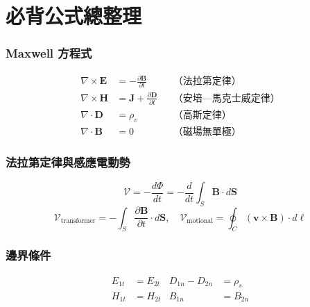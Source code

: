 \documentclass[12pt,a4paper]{article}
\newcommand{\vE}{\mathbf{E}}
\newcommand{\vB}{\mathbf{B}}
\newcommand{\vH}{\mathbf{H}}
\newcommand{\vJ}{\mathbf{J}}
\newcommand{\vD}{\mathbf{D}}
\newcommand{\vS}{\mathbf{S}}
\newcommand{\emf}{\mathcal{V}}
\begin{document}
\newpage
\part{必背公式總整理}

\section{Maxwell 方程式}

\begin{formulabox}
\begin{align}
  \nabla \times \vE &= -\frac{\partial \vB}{\partial t}
  && \text{（法拉第定律）} \\[6pt]
  \nabla \times \vH &= \vJ + \frac{\partial \vD}{\partial t}
  && \text{（安培—馬克士威定律）} \\[6pt]
  \nabla \cdot \vD &= \rho_v
  && \text{（高斯定律）} \\[6pt]
  \nabla \cdot \vB &= 0
  && \text{（磁場無單極）}
\end{align}
\end{formulabox}

\section{法拉第定律與感應電動勢}

\begin{formulabox}
\[
  \emf = -\frac{d\Phi}{dt} = -\frac{d}{dt}\int_S \vB \cdot d\vS
\]
\[
  \emf_{\text{transformer}} = -\int_S \frac{\partial\vB}{\partial t}\cdot d\vS, \quad
  \emf_{\text{motional}} = \oint_C (\mathbf{v}\times\vB)\cdot d\boldsymbol{\ell}
\]
\end{formulabox}

\section{邊界條件}

\begin{formulabox}
\begin{align*}
  E_{1t} &= E_{2t} & D_{1n} - D_{2n} &= \rho_s \\
  H_{1t} &= H_{2t} & B_{1n} &= B_{2n}
\end{align*}
\end{formulabox}
\end{document}
